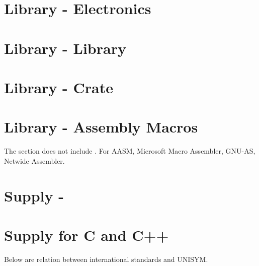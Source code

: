\section{Library \mbox{-} Electronics}

\section{Library \mbox{-}  Library}

\section{Library \mbox{-}  Crate}

\section{Library \mbox{-} Assembly Macros}

The section does not include . For AASM, Microsoft Macro Assembler, GNU-AS, Netwide Assembler.

\section{Supply \mbox{-} }

\section{Supply for C and C++}

Below are relation between international standards and UNISYM.

